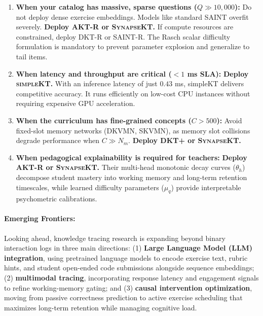 \documentclass[11pt]{article}
\begin{document}
\begin{enumerate}
    \item \textbf{When your catalog has massive, sparse questions ($Q \gg 10,000$):}
    Do not deploy dense exercise embeddings. Models like standard \textsc{SAINT} overfit severely. \textbf{Deploy \textsc{AKT-R} or \textsc{SynapseKT}.} If compute resources are constrained, deploy \textsc{DKT-R} or \textsc{SAINT-R}. The Rasch scalar difficulty formulation is mandatory to prevent parameter explosion and generalize to tail items.
    
    \item \textbf{When latency and throughput are critical ($< 1$ ms SLA):}
    \textbf{Deploy \textsc{simpleKT}.} With an inference latency of just $0.43$ ms, simpleKT delivers competitive accuracy. It runs efficiently on low-cost CPU instances without requiring expensive GPU acceleration.
    
    \item \textbf{When the curriculum has fine-grained concepts ($C > 500$):}
    Avoid fixed-slot memory networks (\textsc{DKVMN}, \textsc{SKVMN}), as memory slot collisions degrade performance when $C \gg N_m$. \textbf{Deploy \textsc{DKT+} or \textsc{SynapseKT}.}
    
    \item \textbf{When pedagogical explainability is required for teachers:}
    \textbf{Deploy \textsc{AKT-R} or \textsc{SynapseKT}.} Their multi-head monotonic decay curves ($\theta_h$) decompose student mastery into working memory and long-term retention timescales, while learned difficulty parameters ($\mu_q$) provide interpretable psychometric calibrations.
\end{enumerate}

\paragraph{Emerging Frontiers:}
Looking ahead, knowledge tracing research is expanding beyond binary interaction logs in three main directions: (1) \textbf{Large Language Model (LLM) integration}, using pretrained language models to encode exercise text, rubric hints, and student open-ended code submissions alongside sequence embeddings; (2) \textbf{multimodal tracing}, incorporating response latency and engagement signals to refine working-memory gating; and (3) \textbf{causal intervention optimization}, moving from passive correctness prediction to active exercise scheduling that maximizes long-term retention while managing cognitive load.
\end{document}
